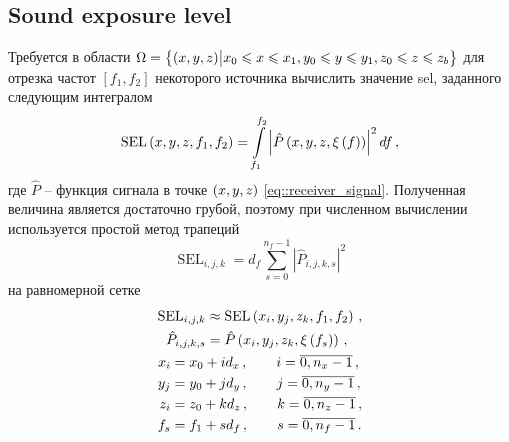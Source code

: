 \documentclass[../document.tex]{subfiles}
\begin{document}
        \subsection{Sound exposure level\label{sec::SEL}}
            \par Требуется в области $\Omega=\left\{\left(x,y,z\right)\bigr|x_0\leqslant x\leqslant x_1,y_0\leqslant y\leqslant y_1,z_0\leqslant z\leqslant z_b\right\}$ для отрезка частот $\left[f_1,f_2\right]$ некоторого источника вычислить значение \acrshort{sel}, заданного следующим интегралом
            \begin{equation}\label{eq::SEL}
                \operatorname{SEL}\left(x,y,z,f_1,f_2\right)=\int\limits_{f_1}^{f_2}\left|\hat{P}\left(x,y,z,\xi\left(f\right)\right)\right|^2df\,,
            \end{equation}
            где $\hat{P}$ -- функция сигнала в точке $\left(x,y,z\right)$ \eqref{eq::receiver_signal}. Полученная величина является достаточно грубой, поэтому при численном вычислении  используется простой метод трапеций \cite{davis}
            \begin{equation}
                \operatorname{SEL}_{i,j,k}=d_f\sum\limits_{s=0}^{n_f-1}\left|\hat{P}_{i,j,k,s}\right|^2
            \end{equation}
            на равномерной сетке
            \begin{equation}
                \begin{gathered}
                    \begin{aligned}
                        \operatorname{SEL}_{i,j,k}&\approx\operatorname{SEL}\left(x_i,y_j,z_k,f_1,f_2\right)\,,\\
                        \hat{P}_{i,j,k,s}&=\hat{P}\left(x_i,y_j,z_k,\xi\left(f_s\right)\right)\,,\\
                    \end{aligned}\\
                    \begin{aligned}
                        x_i&=x_0+id_x\,,\qquad i=\overline{0,n_x-1}\,,\\
                        y_j&=y_0+jd_y\,,\qquad j=\overline{0,n_y-1}\,,\\
                        z_i&=z_0+kd_z\,,\qquad k=\overline{0,n_z-1}\,,\\
                        f_s&=f_1+sd_f\,,\qquad s=\overline{0,n_f-1}\,.
                    \end{aligned}
                \end{gathered}
            \end{equation}
\end{document}
